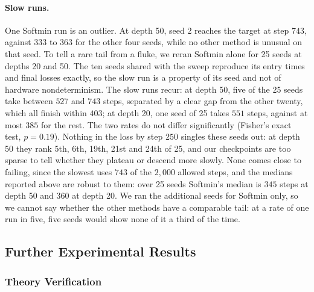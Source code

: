 \documentclass{article}
\theoremstyle{plain}
\theoremstyle{definition}
\theoremstyle{remark}
\begin{document}
\paragraph{Slow runs.} One Softmin run is an outlier. At depth 50, seed 2 reaches the target at step $743$, against
$333$ to $363$ for the other four seeds, while no other method is unusual on that seed. To tell a
rare tail from a fluke, we reran Softmin alone for 25 seeds at depths 20 and 50. The ten seeds
shared with the sweep reproduce its entry times and final losses exactly, so the slow run is a
property of its seed and not of hardware nondeterminism. The slow runs recur: at depth 50, five
of the 25 seeds take between $527$ and $743$ steps, separated by a clear gap from the other twenty,
which all finish within $403$; at depth 20, one seed of 25 takes $551$ steps, against at most
$385$ for the rest. The two rates do not differ significantly (Fisher's exact test, $p=0.19$).
Nothing in the loss by step $250$ singles these seeds out: at depth 50 they rank 5th, 6th, 19th,
21st and 24th of 25, and our checkpoints are too sparse to tell whether they plateau or descend
more slowly. None comes close to failing, since the slowest uses $743$ of the $2{,}000$ allowed
steps, and the medians reported above are robust to them: over 25 seeds Softmin's median is $345$
steps at depth 50 and $360$ at depth 20. We ran the additional seeds for Softmin only, so we cannot
say whether the other methods have a comparable tail: at a rate of one run in five, five seeds
would show none of it a third of the time.

\subsection{Further Experimental Results}
\label{apx:other-experiments}

\subsubsection{Theory Verification}
\label{apx:theory-verification}
\end{document}
